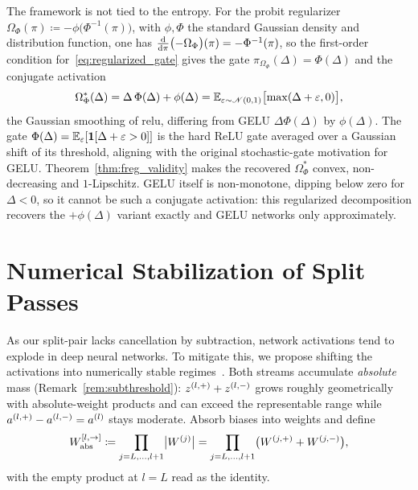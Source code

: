 \begin{remark}\label{rem:probit_gelu}
The framework is not tied to the entropy. For the probit regularizer $\Omega_\Phi(\pi) \coloneqq -\phi\bigl(\Phi^{-1}(\pi)\bigr)$, with $\phi, \Phi$ the standard Gaussian density and distribution function, one has $\frac{\mathop{}\!\textrm{d}}{\mathop{}\!\textrm{d} \pi}\bigl(-\Omega_\Phi\bigr)(\pi) = -\Phi^{-1}(\pi)$, so the first-order condition for~\eqref{eq:regularized_gate} gives the gate $\pi_{\Omega_\Phi}(\Delta) = \Phi(\Delta)$ and the conjugate activation
\begin{equation*}
	\Omega_\Phi^*(\Delta) = \Delta\, \Phi(\Delta) + \phi(\Delta) = \mathbb{E}_{\varepsilon \sim \mathscr{N}(0,1)}\bigl[ \max(\Delta + \varepsilon, 0) \bigr],
\end{equation*}
the Gaussian smoothing of \ac{relu}, differing from GELU $\Delta\Phi(\Delta)$ \parencite{Hendrycks2016} by $\phi(\Delta)$. The gate $\Phi(\Delta)=\mathbb{E}_\varepsilon[\mathbf{1}[\Delta+\varepsilon>0]]$ is the hard ReLU gate averaged over a Gaussian shift of its threshold, aligning with the original stochastic-gate motivation for GELU. Theorem~\ref{thm:freg_validity} makes the recovered $\Omega_\Phi^*$ convex, non-decreasing and $1$-Lipschitz. GELU itself is non-monotone, dipping below zero for $\Delta<0$, so it cannot be such a conjugate activation: this regularized decomposition recovers the $+\phi(\Delta)$ variant exactly and GELU networks only approximately.
\end{remark}

\section{Numerical Stabilization of Split Passes}\label{sec:stabilization_dc}

As our split-pair lacks cancellation by subtraction, network activations tend to explode in deep neural networks. To mitigate this, we propose shifting the activations into numerically stable regimes~\parencite{hiddenMono}. Both streams accumulate \emph{absolute} mass (Remark~\ref{rem:subthreshold}): $z^{(l,+)}+z^{(l,-)}$ grows roughly geometrically with absolute-weight products and can exceed the representable range while $a^{(l,+)}-a^{(l,-)}=a^{(l)}$ stays moderate. Absorb biases into weights and define
\begin{equation}
	W_{\mathrm{abs}}^{[l, \rightarrow]} \coloneqq \prod_{j = L, \dots, l+1} \bigl| W^{(j)} \bigr|
	= \prod_{j = L, \dots, l+1} \bigl( W^{(j,+)} + W^{(j,-)} \bigr),
	\label{eq:w_abs}
\end{equation}
with the empty product at $l = L$ read as the identity.

